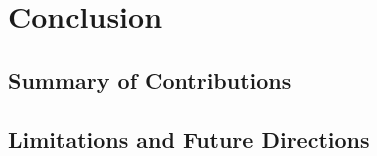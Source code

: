 \chapter{Conclusion} \label{ch:70-conclusion}

\section{Summary of Contributions} \label{sec:71-conclusion-summary}

\section{Limitations and Future Directions} \label{sec:72-conclusion-future-work}

